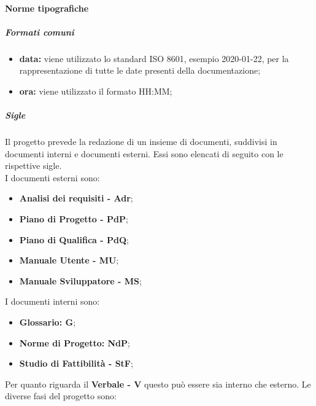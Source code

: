 			\paragraph{Norme tipografiche}
				
				\subparagraph{Formati comuni}
					\begin{itemize}
						\item \textbf{data:} viene utilizzato lo standard ISO 8601, esempio 2020-01-22, per la rappresentazione di tutte le date presenti della documentazione;
						\item \textbf{ora:} viene utilizzato il formato HH:MM;
					\end{itemize}
				\subparagraph{Sigle}
				Il progetto prevede la redazione di un insieme di documenti, suddivisi in documenti interni e documenti esterni. Essi sono elencati di seguito con le rispettive sigle.\\
				I documenti esterni sono:
				\begin{itemize}
				\item \textbf{Analisi dei requisiti - Adr};
				\item \textbf{Piano di Progetto - PdP};
				\item \textbf{Piano di Qualifica - PdQ};
				\item \textbf{Manuale Utente - MU};
				\item \textbf{Manuale Sviluppatore - MS};
				\end{itemize}
				I documenti interni sono:
				\begin{itemize}
				\item \textbf{Glossario: G};
				\item \textbf{Norme di Progetto: NdP};
				\item \textbf{Studio di Fattibilità - StF};
				\end{itemize}
				Per quanto riguarda il \textbf{Verbale - V} questo può essere sia interno che esterno.
				Le diverse fasi del progetto sono: 
